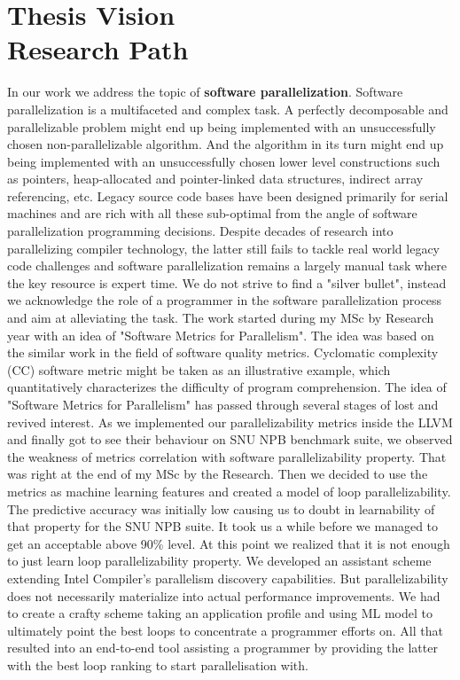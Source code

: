 \documentclass[10pt,a4paper]{report}
\begin{document}
\chapter{Thesis Vision\\{\Large Research Path}}
\quad In our work we address the topic of \textbf{software parallelization}. Software parallelization is a multifaceted and complex task. A perfectly decomposable and parallelizable problem might end up being implemented with an unsuccessfully chosen non-parallelizable algorithm. And the algorithm in its turn might end up being implemented with an unsuccessfully chosen lower level constructions such as pointers, heap-allocated and pointer-linked data structures, indirect array referencing, etc. Legacy source code bases have been designed primarily for serial machines and are rich with all these sub-optimal from the angle of software parallelization programming decisions.\newline\null
\quad Despite decades of research into parallelizing compiler technology, the latter still fails to tackle real world legacy code challenges and software parallelization remains a largely manual task where the key resource is expert time. We do not strive to find a "silver bullet", instead we acknowledge the role of a programmer in the software parallelization process and aim at alleviating the task.\newline\null
\quad The work started during my MSc by Research year with an idea of "Software Metrics for Parallelism". The idea was based on the similar work in the field of software quality metrics. Cyclomatic complexity (CC) software metric might be taken as an illustrative example, which quantitatively characterizes the difficulty of program comprehension. The idea of "Software Metrics for Parallelism" has passed through several stages of lost and revived interest. As we implemented our parallelizability metrics inside the LLVM and finally got to see their behaviour on SNU NPB benchmark suite, we observed the weakness of metrics correlation with software parallelizability property. That was right at the end of my MSc by the Research. Then we decided to use the metrics as machine learning features and created a model of loop parallelizability. The predictive accuracy was initially low causing us to doubt in learnability of that property for the SNU NPB suite. It took us a while before we managed to get an acceptable above 90\% level. At this point we realized that it is not enough to just learn loop parallelizability property. We developed an assistant scheme extending Intel Compiler's parallelism discovery capabilities. But parallelizability does not necessarily materialize into actual performance improvements. We had to create a crafty scheme taking an application profile and using ML model to ultimately point the best loops to concentrate a programmer efforts on. All that resulted into an end-to-end tool assisting a programmer by providing the latter with the best loop ranking to start parallelisation with.\newline\null
\end{document}
